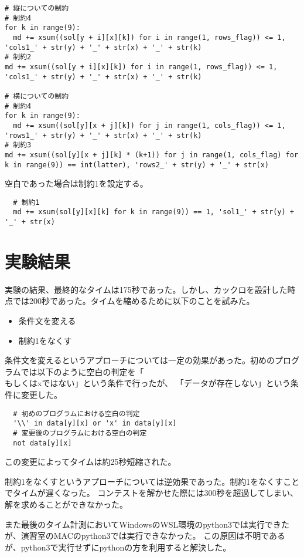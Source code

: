 \documentclass[a4paper,titlepage,11pt]{ltjsarticle}
\begin{document}
\begin{lstlisting}
# 縦についての制約
# 制約4
for k in range(9):
  md += xsum((sol[y + i][x][k]) for i in range(1, rows_flag)) <= 1, 'cols1_' + str(y) + '_' + str(x) + '_' + str(k)
# 制約2
md += xsum((sol[y + i][x][k]) for i in range(1, rows_flag)) <= 1, 'cols1_' + str(y) + '_' + str(x) + '_' + str(k)

# 横についての制約
# 制約4
for k in range(9):
  md += xsum((sol[y][x + j][k]) for j in range(1, cols_flag)) <= 1, 'rows1_' + str(y) + '_' + str(x) + '_' + str(k)
# 制約3
md += xsum((sol[y][x + j][k] * (k+1)) for j in range(1, cols_flag) for k in range(9)) == int(latter), 'rows2_' + str(y) + '_' + str(x)
\end{lstlisting}

空白であった場合は制約1を設定する。
\begin{lstlisting}
  # 制約1
  md += xsum(sol[y][x][k] for k in range(9)) == 1, 'sol1_' + str(y) + '_' + str(x)
\end{lstlisting}

\section{実験結果}
実験の結果、最終的なタイムは175秒であった。しかし、カックロを設計した時点では200秒であった。タイムを縮めるために以下のことを試みた。
\begin{itemize}
  \item 条件文を変える
  \item 制約1をなくす
\end{itemize}

条件文を変えるというアプローチについては一定の効果があった。初めのプログラムでは以下のように空白の判定を「\\もしくはxではない」という条件で行ったが、
「データが存在しない」という条件に変更した。
\begin{lstlisting}
  # 初めのプログラムにおける空白の判定
  '\\' in data[y][x] or 'x' in data[y][x]
  # 変更後のプログラムにおける空白の判定
  not data[y][x]
\end{lstlisting}
この変更によってタイムは約25秒短縮された。

制約1をなくすというアプローチについては逆効果であった。制約1をなくすことでタイムが遅くなった。
コンテストを解かせた際には300秒を超過してしまい、解を求めることができなかった。

また最後のタイム計測においてWindowsのWSL環境のpython3では実行できたが、演習室のMACのpython3では実行できなかった。
この原因は不明であるが、python3で実行せずにpythonの方を利用すると解決した。
\end{document}
